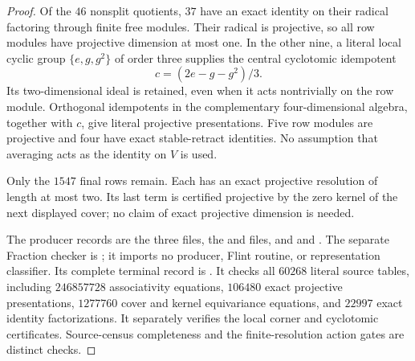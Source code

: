 \begin{proof}
Of the $46$ nonsplit quotients, $37$ have an exact identity on
their radical factoring through finite free modules. Their radical
is projective, so all row modules have projective dimension at most
one. In the other nine, a literal local cyclic group
$\{e,g,g^2\}$ of order three supplies the central cyclotomic
idempotent
\[
 c=(2e-g-g^2)/3.
\]
Its two-dimensional ideal is retained, even when it acts nontrivially
on the row module. Orthogonal idempotents in the complementary
four-dimensional algebra, together with $c$, give literal
projective presentations. Five row modules are projective and four
have exact stable-retract identities. No assumption that averaging
acts as the identity on $V$ is used.

Only the $1547$ final rows remain. Each has an exact projective
resolution of length at most two. Its last term is certified
projective by the zero kernel of the next displayed cover; no
claim of exact projective dimension is needed.

The producer records are the three
 files, the
 and
 files, and
and .
The separate Fraction checker is
; it imports no
producer, Flint routine, or representation classifier.
Its complete terminal record is
.
It checks all $60268$ literal source tables, including $246857728$
associativity equations, $106480$ exact projective presentations,
$1277760$ cover and kernel equivariance equations, and $22997$
exact identity factorizations. It separately verifies the local
corner and cyclotomic certificates. Source-census completeness
and the finite-resolution action gates are distinct checks.
\end{proof}

